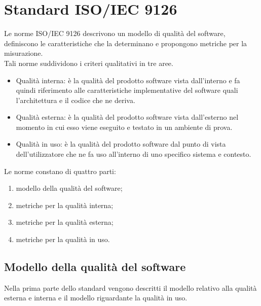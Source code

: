 \section{Standard ISO/IEC 9126}
	Le norme ISO/IEC 9126 descrivono un modello di qualità del software, definiscono le caratteristiche che la determinano e propongono metriche per la misurazione.\\
	Tali norme suddividono i criteri qualitativi in tre aree.
	\begin{itemize}
		\item Qualità interna: è la qualità del prodotto software vista dall’interno e fa quindi riferimento alle caratteristiche implementative del software quali l’architettura e il codice che ne deriva.
		\item Qualità esterna: è la qualità del prodotto software vista dall’esterno nel momento in cui esso viene eseguito e testato in un ambiente di prova.
		\item Qualità in uso: è la qualità del prodotto software dal punto di vista dell’utilizzatore che ne fa uso all’interno di uno specifico sistema e contesto.
	\end{itemize}
	Le norme constano di quattro parti:
	\begin{enumerate}
		\item modello della qualità del software;
		\item metriche per la qualità interna;
		\item metriche per la qualità esterna;
		\item metriche per la qualità in uso.
	\end{enumerate}
	\subsection{Modello della qualità del software}
		Nella prima parte dello standard vengono descritti il modello relativo alla qualità esterna e interna e il modello riguardante la qualità in uso.
